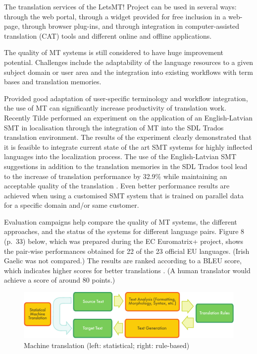 \begin{multicols}{2}
The translation services of the LetsMT! Project can be used in several ways: through the web portal, through a widget provided for free inclusion in a web-page, through browser plug-ins, and through integration in computer-assisted translation (CAT) tools and different online and offline applications. 

The quality of MT systems is still considered to have huge improvement potential.
Challenges include the adaptability of the language resources to a given subject domain or user area and the integration into existing workflows with term bases and translation memories. 

Provided good adaptation of user-specific terminology and workflow integration, the use of MT can significantly increase productivity of translation work.
Recently Tilde performed an experiment on the application of an English-Latvian SMT in localisation through the integration of MT into the SDL Trados translation environment.
The results of the experiment clearly demonstrated that it is feasible to integrate current state of the art SMT systems for highly inflected languages into the localization process.
The use of the English-Latvian SMT suggestions in addition to the translation memories in the SDL Trados tool lead to the increase of translation performance by 32.9\% while maintaining an acceptable quality of the translation \cite{Meta35}.
Even better performance results are achieved when using a customised SMT system that is trained on parallel data for a specific domain and/or same customer. 

Evaluation campaigns help compare the quality of MT systems, the different approaches, and the status of the systems for different language pairs.
Figure 8 (p.~33) below, which was prepared during the EC Euromatrix+ project, shows the pair-wise performances obtained for 22 of the 23 official EU languages.
(Irish Gaelic was not compared.) The results are ranked according to a BLEU score, which indicates higher scores for better translations \cite{Meta36}.
(A human translator would achieve a score of around 80 points.) 

\begin{figure}[htb]
  \center
  \includegraphics[width=\textwidth]{../_media/english/machine_translation}
  \caption{Machine translation (left: statistical; right: rule-based)}
  \label{fig:mtarch_en}
\end{figure}


\end{multicols}
